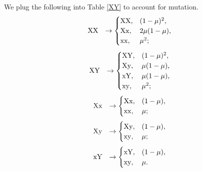 \documentclass[referee,sn-basic]{sn-jnl}%
\theoremstyle{thmstyleone}%
\theoremstyle{thmstyletwo}%
\theoremstyle{thmstylethree}%
\begin{document}
We plug the following into Table \ref{XY} to account for mutation. 
\begin{equation} \label{1}
  \begin{array}{lllll}
  {\rm XX}&\to 
  \begin{cases}
    {\rm XX}, &(1-\mu)^2,\\ {\rm Xx}, &2\mu(1-\mu),\\{\rm xx}, &\mu^2 ; 
  \end{cases}
  \end{array} 
\end{equation}
\vspace{-0.5cm}
\begin{equation} \label{2}
  \begin{array}{lllll}
  {\rm XY}&\to 
  \begin{cases}
   {\rm XY}, &(1-\mu)^2,\\ {\rm Xy}, &\mu(1-\mu),\\ {\rm xY}, &\mu(1-\mu),\\ {\rm xy}, &\mu^2 ;
  \end{cases}
  \end{array} 
\end{equation}
\vspace{-0.0cm}
\begin{equation} \label{3}
  \begin{array}{lllll}
   {\rm Xx}&\to 
  \begin{cases}
  {\rm Xx}, &(1-\mu),\\  {\rm xx}, &\mu; \\
  \end{cases} 
  \end{array} 
\end{equation}
\vspace{-0.0cm}
\begin{equation} \label{4}
  \begin{array}{lllll}
	{\rm Xy}&\to 
	\begin{cases}
    		{\rm Xy}, &(1-\mu),\\ {\rm xy}, &\mu;
	\end{cases}
  \end{array} 
\end{equation}
\vspace{-0.0cm}
\begin{equation} \label{5}
\begin{array}{lllll}
 {\rm xY}&\to 
  \begin{cases}
  {\rm xY}, &(1-\mu),\\{\rm xy}, &\mu.
  \end{cases}
  \end{array} 
\end{equation}
\end{document}
